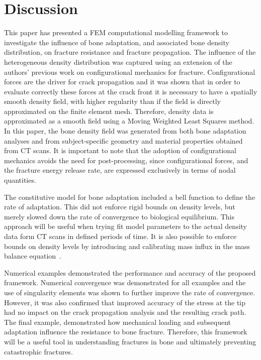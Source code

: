 \documentclass[review]{elsarticle}
\numberwithin{equation}{section}
\begin{document}
\section{Discussion}\label{sec:discussion}
This paper has presented a FEM computational modelling framework to investigate the influence of bone adaptation, and associated bone density distribution, on fracture resistance and fracture propagation. 
The influence of the heterogeneous density distribution was captured using an extension of the authors' previous work on configurational mechanics for fracture. 
Configurational forces are the driver for crack propagation and it was shown that in order to evaluate correctly these forces at the crack front it is necessary to have a spatially smooth density field, with higher regularity than if the field is directly approximated on the finite element mesh. 
Therefore, density data is approximated as a smooth field using a Moving Weighted Least Squares method. 
In this paper, the bone density field was generated from both bone adaptation analyses and from subject-specific geometry and material properties obtained from CT scans. 
It is important to note that the adoption of configurational mechanics avoids the need for post-processing, since configurational forces, and the fracture energy release rate, are expressed exclusively in terms of nodal quantities.



The constitutive model for bone adaptation included a bell function to define the rate of adaptation. 
This did not enforce rigid bounds on density levels, but merely slowed down the rate of convergence to biological equilibrium. 
This approach will be useful when trying fit model parameters to the actual density data form CT scans in defined periods of time. 
It is also possible to enforce bounds on density levels by introducing and calibrating mass influx in the mass balance equation~\citep{sharma2013adaptive}. 

Numerical examples demonstrated the performance and accuracy of the proposed framework. 
Numerical convergence was demonstrated for all examples and the use of singularity elements was shown to further improve the rate of convergence. However, it was also confirmed that improved accuracy of the stress at the tip had no impact on the crack propagation analysis and the resulting crack path.  The final example, demonstrated how mechanical loading and subsequent adaptation influence the resistance to bone fracture. Therefore, this framework will be a useful tool in understanding fractures in bone and ultimately preventing catastrophic fractures. 
\end{document}
